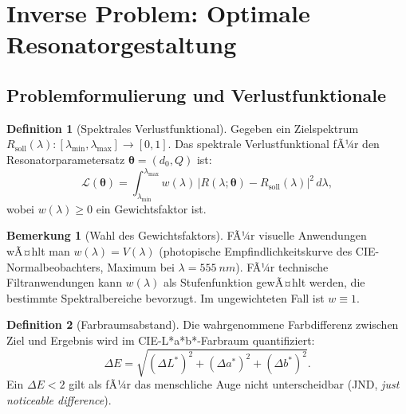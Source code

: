 ﻿\documentclass[a4paper,12pt]{article}
\theoremstyle{definition}
\newtheorem{definition}{Definition}[section]
\newtheorem{bemerkung}{Bemerkung}[section]
\newcommand{\vect}[1]{\bm{#1}}
\begin{document}
	\section{Inverse Problem: Optimale Resonatorgestaltung}
	\label{sec:invers}
	
	\subsection{Problemformulierung und Verlustfunktionale}
	
	\begin{definition}[Spektrales Verlustfunktional]
		\label{def:verlustfunktional}
		Gegeben ein Zielspektrum $R_\mathrm{soll}(\lambda): [\lambda_\mathrm{min}, \lambda_\mathrm{max}] \to [0,1]$.
		Das spektrale Verlustfunktional fÃ¼r den Resonatorparametersatz
		$\vect{\theta} = (d_0, Q)$ ist:
		\begin{equation}
			\mathcal{L}(\vect{\theta}) = \int_{\lambda_\mathrm{min}}^{\lambda_\mathrm{max}}
			w(\lambda)\,\bigl|R(\lambda; \vect{\theta}) - R_\mathrm{soll}(\lambda)\bigr|^2\, d\lambda,
			\label{eq:verlust}
		\end{equation}
		wobei $w(\lambda) \geq 0$ ein Gewichtsfaktor ist.
	\end{definition}
	
	\begin{bemerkung}[Wahl des Gewichtsfaktors]
		FÃ¼r visuelle Anwendungen wÃ¤hlt man $w(\lambda) = V(\lambda)$
		(photopische Empfindlichkeitskurve des CIE-Normalbeobachters,
		Maximum bei $\lambda = \SI{555}{nm}$). FÃ¼r technische Filtranwendungen
		kann $w(\lambda)$ als Stufenfunktion gewÃ¤hlt werden, die bestimmte
		Spektralbereiche bevorzugt. Im ungewichteten Fall ist $w \equiv 1$.
	\end{bemerkung}
	
	\begin{definition}[Farbraumsabstand]
		\label{def:farbraum}
		Die wahrgenommene Farbdifferenz zwischen Ziel und Ergebnis wird im
		CIE-L*a*b*-Farbraum quantifiziert:
		\begin{equation}
			\Delta E = \sqrt{(\Delta L^*)^2 + (\Delta a^*)^2 + (\Delta b^*)^2}.
			\label{eq:deltaE}
		\end{equation}
		Ein $\Delta E < 2$ gilt als fÃ¼r das menschliche Auge nicht unterscheidbar
		(JND, \textit{just noticeable difference}).
	\end{definition}
	
\end{document}

